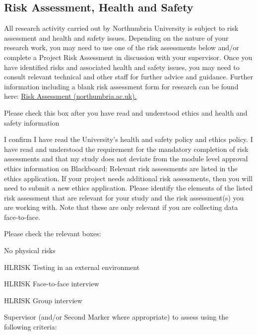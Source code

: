 \documentclass[../CHEFCookingHelperForEveryonesFridge.tex]{subfiles}
\begin{document}

\subsection{Risk Assessment, Health and Safety}
All research activity carried out by Northumbria University is subject to risk assessment and health and safety
issues. Depending on the nature of your research work, you may need to use one of the risk assessments below
and/or complete a Project Risk Assessment in discussion with your supervisor. Once you have identified risks
and associated health and safety issues, you may need to consult relevant technical and other staff for further
advice and guidance. Further information including a blank risk assessment form for research can be found here:
\href{https://www.northumbria.ac.uk/about-us/health-safety-resources/risk-assessment/}{Risk Assessment (northumbria.ac.uk).}

Please check this box after you have read and understood ethics and health and safety information

   I confirm I have read the University's health and safety policy and ethics policy.
I have read and understood the requirement for the mandatory completion of risk assessments and that my study
does not deviate from the module level approval ethics information on Blackboard: Relevant risk assessments
are listed in the ethics application. If your project needs additional risk assessments, then you will need
to submit a new ethics application. Please identify the elements of the listed risk assessment that are relevant
for your study and the risk assessment(s) you are working with. Note that these are only relevant if you are
collecting data face-to-face.

Please check the relevant boxes:

   No physical risks

   HL\textunderscore RISK Testing in an external environment

   HL\textunderscore RISK Face-to-face interview

   HL\textunderscore RISK Group interview

Supervisor (and/or Second Marker where appropriate) to assess using the following criteria:
\end{document}
